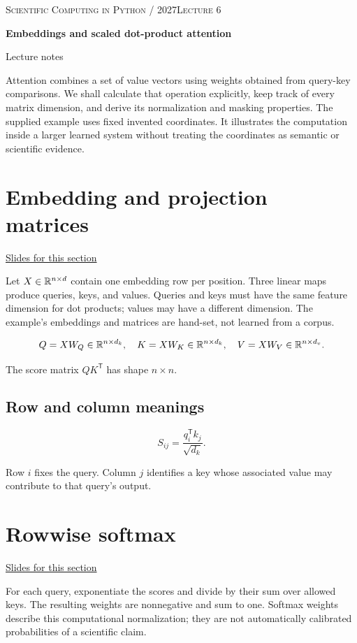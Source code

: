 \documentclass[11pt,letterpaper]{article}
\theoremstyle{definition}\newtheorem{definition}{Definition}\newtheorem{example}{Example}
\numberwithin{equation}{section}
\begin{document}
{\small\scshape Scientific Computing in Python / 2027\hfill Lecture 6}\par\medskip
{\raggedright{}\LARGE\bfseries\color{ink} Embeddings and scaled dot-product attention\par}\medskip
{\small Lecture notes}\par\bigskip
Attention combines a set of value vectors using weights obtained from query-key comparisons. We shall calculate that operation explicitly, keep track of every matrix dimension, and derive its normalization and masking properties. The supplied example uses fixed invented coordinates. It illustrates the computation inside a larger learned system without treating the coordinates as semantic or scientific evidence.

\section{Embedding and projection matrices}
\hypertarget{note-embedding-and-projection-matrices}{}\label{note:embedding-and-projection-matrices}
{\small \href{slides.html\#frame=embedding-and-projection-matrices\&step=1}{Slides for this section}}\par
Let $X\in\mathbb{R}^{n\times d}$ contain one embedding row per position. Three linear maps produce queries, keys, and values. Queries and keys must have the same feature dimension for dot products; values may have a different dimension. The example's embeddings and matrices are hand-set, not learned from a corpus.

\[
Q=XW_Q\in\mathbb{R}^{n\times d_k},\quad
K=XW_K\in\mathbb{R}^{n\times d_k},\quad
V=XW_V\in\mathbb{R}^{n\times d_v}.
\]

The score matrix $QK^{\mathsf T}$ has shape $n\times n$.

\subsection*{Row and column meanings}
\[
S_{ij}=\frac{q_i^{\mathsf T}k_j}{\sqrt{d_k}}.
\]

Row $i$ fixes the query. Column $j$ identifies a key whose associated value may contribute to that query's output.
\section{Rowwise softmax}
\hypertarget{note-rowwise-softmax}{}\label{note:rowwise-softmax}
{\small \href{slides.html\#frame=rowwise-softmax\&step=1}{Slides for this section}}\par
For each query, exponentiate the scores and divide by their sum over allowed keys. The resulting weights are nonnegative and sum to one. Softmax weights describe this computational normalization; they are not automatically calibrated probabilities of a scientific claim.
\end{document}
